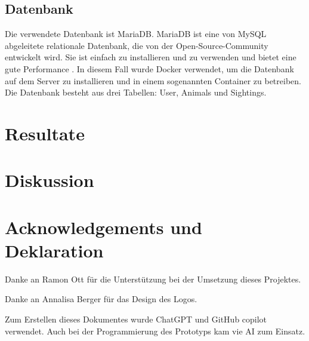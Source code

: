 \documentclass{article}
\begin{document}
\subsection{Datenbank} %

Die verwendete Datenbank ist MariaDB. MariaDB ist eine von MySQL abgeleitete relationale Datenbank, die von der
Open-Source-Community entwickelt wird. Sie ist einfach zu installieren und zu verwenden und bietet eine gute Performance \autocite{MariaDBFoundation}.
In diesem Fall wurde Docker verwendet, um die Datenbank auf dem Server zu installieren und in einem 
sogenannten Container zu betreiben. Die Datenbank besteht aus drei Tabellen: User, Animals und Sightings.

\section{Resultate} %

\section{Diskussion} %


\section{Acknowledgements und Deklaration} %

Danke an Ramon Ott für die Unterstützung bei der Umsetzung dieses Projektes.

Danke an Annalisa Berger für das Design des Logos.

Zum Erstellen dieses Dokumentes wurde ChatGPT und GitHub copilot verwendet.
Auch bei der Programmierung des Prototyps kam vie AI zum Einsatz.

\printbibliography
\end{document}
